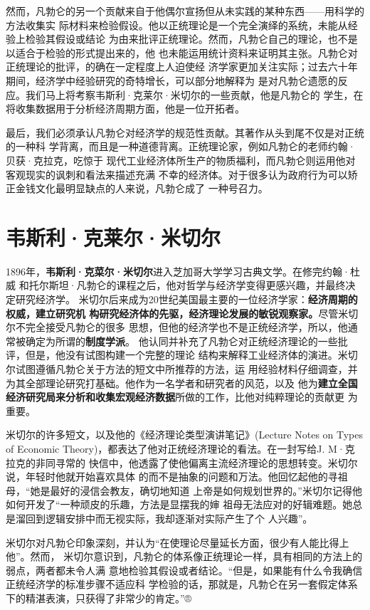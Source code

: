 然而，凡勃仑的另一个贡献来自于他偶尔宣扬但从未实践的某种东西——用科学的方法收集实
际材料来检验假设。他以正统理论是一个完全演绎的系统，未能从经验上检验其假设或结论
为由来批评正统理论。然而，凡勃仑自己的理论，也不是以适合于检验的形式提出来的，他
也未能运用统计资料来证明其主张。凡勃仑对正统理论的批评，的确在一定程度上人迫使经
济学家更加关注实际；过去六十年期间，经济学中经验研究的奇特增长，可以部分地解释为
是对凡勃仑遗愿的反应。我们马上将考察韦斯利·克莱尔·米切尔的一些贡献，他是凡勃仑的
学生，在将收集数据用于分析经济周期方面，他是一位开拓者。

最后，我们必须承认凡勃仑对经济学的规范性贡献。其著作从头到尾不仅是对正统的一种科
学背离，而且是一种道德背离。正统理论家，例如凡勃仑的老师约翰·贝获·克拉克，吃惊于
现代工业经济体所生产的物质福利，而凡勃仑则运用他对客观现实的讽刺和看法来描述充满
不幸的经济体。对于很多认为政府行为可以矫正金钱文化最明显缺点的人来说，凡勃仑成了
一种号召力。

\section{韦斯利·克莱尔·米切尔}

1896年，\textbf{韦斯利·克菜尔·米切尔}进入芝加哥大学学习古典文学。在修完约翰·杜威
和托尔斯坦·凡勃仑的课程之后，他对哲学与经济学变得更感兴趣，并最终决定研究经济学。
米切尔后来成为20世纪美国最主要的一位经济学家：\textbf{经济周期的权威，建立研究机
  构研究经济体的先驱，经济理论发展的敏锐观察家。}尽管米切尔不完全接受凡勃仑的很多
思想，但他的经济学也不是正统经济学，所以，他通常被确定为所谓的\textbf{制度学派}。
他认同并补充了凡勃仑对正统经济理论的一些批评，但是，他没有试图构建一个完整的理论
结构来解释工业经济体的演进。米切尔试图遵循凡勃仑关于方法的短文中所推荐的方法，运
用经验材料仔细调查，并为其全部理论研究打基础。他作为一名学者和研究者的风范，以及
他为\textbf{建立全国经济研究局来分析和收集宏观经济数据}所做的工作，比他对纯粹理论的贡献更
为重要。

米切尔的许多短文，以及他的《经济理论类型演讲笔记》(Lecture Notes on Types of
Economic Theory)，都表达了他对正统经济理论的看法。在一封写给J. M·克拉克的非同寻常的
快信中，他透露了使他偏离主流经济理论的思想转变。米切尔说，年轻时他就开始喜欢具体
的而不是抽象的问题和万法。他回忆起他的寻祖母，“她是最好的浸信会教友，确切地知道
上帝是如何规划世界的。”米切尔记得他如何开发了“一种顽皮的乐趣，方法是显摆我的婶
祖母无法应对的好辑难题。她总是溜回到逻辑安排中而无视实际，我却逐渐对实际产生了个
人兴趣”。

米切尔对凡勃仑印象深刻，并认为“在使理论尽量延长方面，很少有人能比得上他”。然而，
米切尔意识到，凡勃仑的体系像正统理论一样，具有相同的方法上的弱点，两者都未令人满
意地检验其假设或者结论。“但是，如果能有什么令我确信正统经济学的标准步骤不适应科
学检验的话，那就是，凡勃仑在另一套假定体系下的精湛表演，只获得了非常少的肯定。”®

